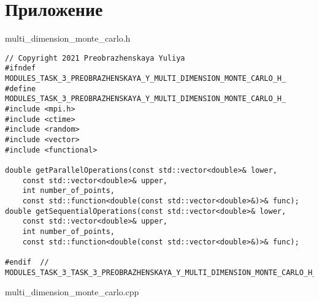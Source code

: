 \documentclass{report}
\begin{document}
\section*{Приложение}

multi\_dimension\_monte\_carlo.h
\begin{lstlisting}
// Copyright 2021 Preobrazhenskaya Yuliya
#ifndef MODULES_TASK_3_PREOBRAZHENSKAYA_Y_MULTI_DIMENSION_MONTE_CARLO_H_
#define MODULES_TASK_3_PREOBRAZHENSKAYA_Y_MULTI_DIMENSION_MONTE_CARLO_H_
#include <mpi.h>
#include <ctime>
#include <random>
#include <vector>
#include <functional>

double getParallelOperations(const std::vector<double>& lower,
    const std::vector<double>& upper,
    int number_of_points,
    const std::function<double(const std::vector<double>&)>& func);
double getSequentialOperations(const std::vector<double>& lower,
    const std::vector<double>& upper,
    int number_of_points,
    const std::function<double(const std::vector<double>&)>& func);

#endif  // MODULES_TASK_3_TASK_3_PREOBRAZHENSKAYA_Y_MULTI_DIMENSION_MONTE_CARLO_H_

\end{lstlisting}
multi\_dimension\_monte\_carlo.cpp
\end{document}
